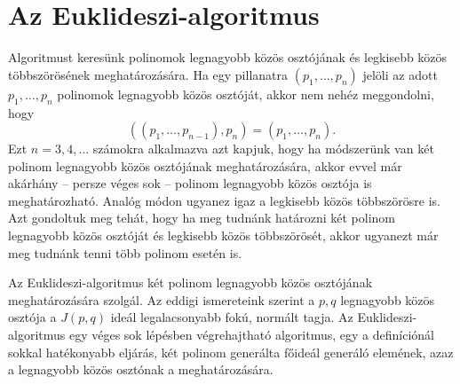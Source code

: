 \documentclass[9pt, a4paper, showtrims]{memoir}
\theoremstyle{plain}
\theoremstyle{remark}
\theoremstyle{definition}
\begin{document}
\section{Az Euklideszi-algoritmus}
Algoritmust keresünk polinomok legnagyobb közös osztójának és legkisebb közös többszörösének meghatározására.
Ha egy pillanatra $\left( p_1,\ldots,p_n \right)$ jelöli az adott $p_1,\ldots,p_n$ polinomok legnagyobb közös osztóját,
akkor nem nehéz meggondolni,
hogy
\[
	\left( \left( p_1,\ldots,p_{n-1} \right),p_n \right)=\left( p_1,\ldots,p_{n}\right).
\]
Ezt $n=3,4,\ldots$ számokra alkalmazva azt kapjuk,
hogy ha módszerünk van két polinom legnagyobb közös osztójának meghatározására,
akkor evvel már akárhány -- persze véges sok -- polinom legnagyobb közös osztója is meghatározható.
Analóg módon ugyanez igaz a legkisebb közös többszörösre is.
Azt gondoltuk meg tehát, hogy ha meg tudnánk határozni két polinom legnagyobb közös osztóját és legkisebb közös többszörösét,
akkor ugyanezt már meg tudnánk tenni több polinom esetén is.

Az Euklideszi-algoritmus két polinom legnagyobb közös osztójának meghatározására szolgál.
Az eddigi ismereteink szerint a $p,q$ legnagyobb közös osztója a $J\left( p,q \right)$ ideál legalacsonyabb
fokú, normált tagja.
Az Euklideszi-algoritmus egy véges sok lépésben végrehajtható algoritmus,
egy a definíciónál sokkal hatékonyabb eljárás, két polinom generálta főideál generáló elemének,
azaz a legnagyobb közös osztónak a meghatározására.
\end{document}

